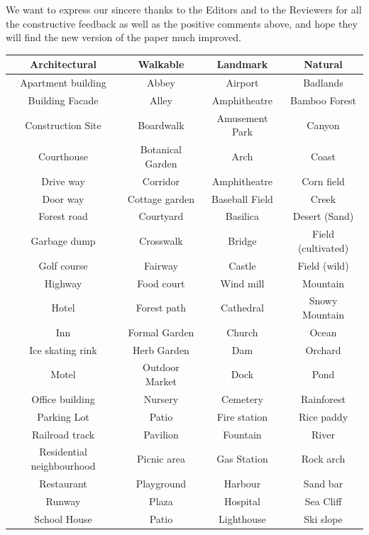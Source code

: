 \documentclass{paper}
\begin{document}
We want to express our sincere thanks to the Editors and to the Reviewers for all the constructive feedback as well as the positive comments above, and hope they will find the new version of the paper much improved.

\begin{table}[htb!]
    \centering
    \begin{tabular}{ |c|c|c|c| }
        \hline
        \textbf{Architectural} & \textbf{Walkable} & \textbf{Landmark} & \textbf{Natural} \\
        \hline
        Apartment building & Abbey & Airport & Badlands\\
        Building Facade & Alley & Amphitheatre & Bamboo Forest\\
        Construction Site & Boardwalk & Amusement Park & Canyon \\
        Courthouse & Botanical Garden & Arch & Coast \\
        Drive way & Corridor & Amphitheatre & Corn field \\
        Door way & Cottage garden & Baseball Field & Creek \\
        Forest road & Courtyard & Basilica & Desert (Sand) \\
        Garbage dump & Crosswalk & Bridge & Field (cultivated)\\
        Golf course & Fairway & Castle & Field (wild)\\
        Highway & Food court & Wind mill & Mountain \\
        Hotel & Forest path & Cathedral & Snowy Mountain \\
        Inn & Formal Garden & Church & Ocean \\
        Ice skating rink & Herb Garden & Dam & Orchard \\
        Motel & Outdoor Market & Dock & Pond \\
        Office building & Nursery & Cemetery & Rainforest \\
        Parking Lot & Patio & Fire station & Rice paddy \\
        Railroad track & Pavilion & Fountain & River \\
        Residential neighbourhood & Picnic area & Gas Station & Rock arch\\
        Restaurant & Playground & Harbour & Sand bar \\
        Runway & Plaza & Hospital & Sea Cliff\\
        School House & Patio & Lighthouse & Ski slope \\

\end{tabular}
\end{table}
\end{document}
